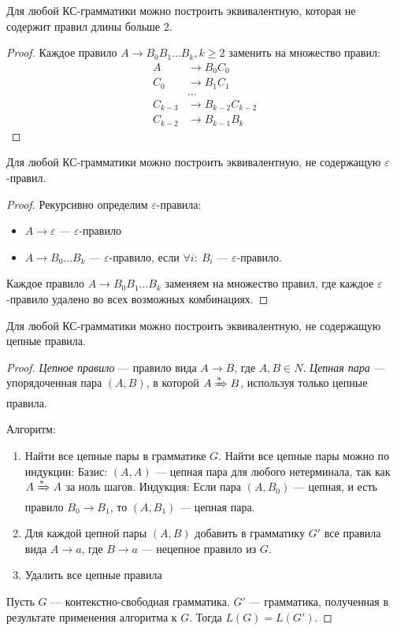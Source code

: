 \begin{lemma}
  Для любой КС-грамматики можно построить эквивалентную, которая не содержит правил длины больше 2.
\end{lemma}

\begin{proof}
  Каждое правило $A \to B_0 B_1 \dots B_k, k \geq 2$ заменить на множество правил:
  \begin{align*}
    A   & \to B_0 C_0 \\
    C_0 & \to B_1 C_1 \\
        & \dots \\
    C_{k-3} & \to B_{k-2} C_{k-2} \\
    C_{k-2} & \to B_{k-1} B_k
  \end{align*}
\end{proof}


\begin{lemma}
  Для любой КС-грамматики можно построить эквивалентную, не содержащую $\varepsilon$-правил.
\end{lemma}

\begin{proof}
  Рекурсивно определим $\varepsilon$-правила:
  \begin{itemize}
    \item $A \to \varepsilon$ --- $\varepsilon$-правило
    \item $A \to B_0 \dots B_k$ --- $\varepsilon$-правило, если $\forall i: \ B_i$ --- $\varepsilon$-правило.
  \end{itemize}

  Каждое правило $A \to B_0 B_1 \dots B_k$ заменяем на множество правил, где каждое $\varepsilon$-правило удалено во всех возможных комбинациях.
\end{proof}

\begin{lemma}
  Для любой КС-грамматики можно построить эквивалентную, не содержащую цепные правила.
\end{lemma}

\begin{proof}
  \textit{Цепное правило} --- правило вида $A \to B\text{, где } A, B \in N$.
  \textit{Цепная пара} --- упорядоченная пара $(A,B)$, в которой $A\xRightarrow[]{*} B$, используя только цепные правила.

  Алгоритм:
  \begin{enumerate}
  \item Найти все цепные пары в грамматике $G$.
  Найти все цепные пары можно по индукции:
  Базис: $(A,A)$ --- цепная пара для любого нетерминала, так как $A\xRightarrow[]{*} A$ за ноль шагов.
  Индукция: Если пара $(A,B_0)$ --- цепная, и есть правило $B_0 \to B_1$, то $(A,B_1)$ --- цепная пара.
  \item Для каждой цепной пары $(A,B)$ добавить в грамматику $G'$ все правила вида $A \to a$, где $B \to a$ --- нецепное правило из $G$.
  \item Удалить все цепные правила
\end{enumerate}
Пусть $G$ --- контекстно-свободная грамматика. $G'$ --- грамматика, полученная в результате применения алгоритма к $G$. Тогда $L(G)=L(G')$.
\end{proof}

